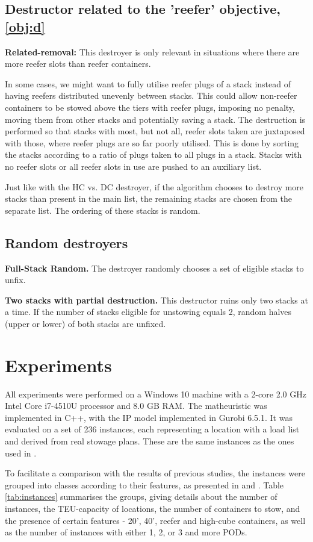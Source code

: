 \documentclass[preprint,11pt,3p]{elsarticle}
\begin{document}
\subsection{Destructor related to the 'reefer' objective, \ref{obj:d}}
\textbf{Related-removal:} This destroyer is only relevant in situations where there are more reefer slots than reefer containers.

In some cases, we might want to fully utilise reefer plugs of a stack instead of having reefers distributed unevenly between stacks. This could allow non-reefer containers to be stowed above the tiers with reefer plugs, imposing no penalty, moving them from other stacks and potentially saving a stack. The destruction is performed so that stacks with most, but not all, reefer slots taken are juxtaposed with those, where reefer plugs are so far poorly utilised. This is done by sorting the stacks according to a ratio of plugs taken to all plugs in a stack. Stacks with no reefer slots or all reefer slots in use are pushed to an auxiliary list.

Just like with the HC vs. DC destroyer, if the algorithm chooses to destroy more stacks than present in the main list, the remaining stacks are chosen from the separate list. The ordering of these stacks is random. 

\subsection{Random destroyers}
\textbf{Full-Stack Random.} The destroyer randomly chooses a set of eligible stacks to unfix.

\textbf{Two stacks with partial destruction.} This destructor ruins only two stacks at a time. If the number of stacks eligible for unstowing equals 2, random halves (upper or lower) of both stacks are unfixed.

\section{Experiments}
\label{sec:Experiments}
All experiments were performed on a Windows 10 machine with a 2-core 2.0 GHz Intel Core i7-4510U processor and 8.0 GB RAM. The matheuristic was implemented in C++, with the IP model implemented in Gurobi 6.5.1. It was evaluated on a set of 236 instances, each representing a location with a load list and derived from real stowage plans. These are the same instances as the ones used in \cite{DJJRA12}.

To facilitate a comparison with the results of previous studies, the instances were grouped into classes according to their features, as presented in \cite{DJJRA12} and \cite{PPAV16}. Table \ref{tab:instances} summarises the groups, giving details about the number of instances, the TEU-capacity of locations, the number of containers to stow, and the presence of certain features - 20', 40', reefer and high-cube containers, as well as the number of instances with either 1, 2, or 3 and more PODs.
\end{document}

